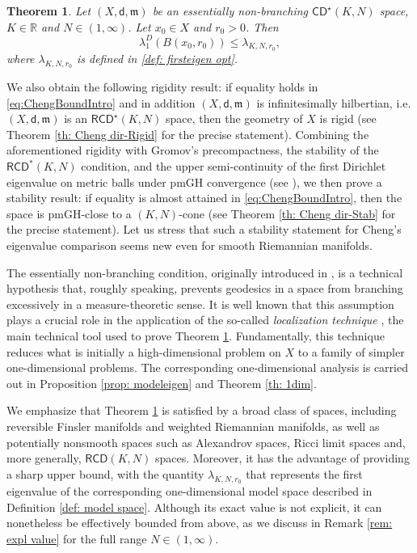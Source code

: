 \documentclass[12pt]{article}
\newcommand{\R}{\mathbb{R}}
\newcommand{\RCD}{\mathsf{RCD}}
\newcommand{\CD}{\mathsf{CD}}
\newcommand{\mm}{\mathfrak m}
\newcommand{\di}{\mathsf{d}}
\theoremstyle{plain}
\newtheorem{theorem}[lemma]{Theorem}
\theoremstyle{definition}
\begin{document}
\begin{theorem}\label{th: Cheng dir}
Let $(X,\di,\mm)$ be an essentially non-branching $\CD^{\star}(K,N)$ space, $K\in \R$ and $N\in (1,\infty)$. Let $x_0\in X$ and $r_0>0$. Then 
\begin{equation}\label{eq:ChengBoundIntro}
\lambda_1^D(B(x_0,r_0))\le \lambda_{K,N,r_0},
\end{equation}
where $\lambda_{K,N,r_0}$ is defined in \eqref{def: firsteigen opt}.
\end{theorem} 
We also obtain the following rigidity result: if equality holds in \eqref{eq:ChengBoundIntro} and in addition $(X,\di,\mm)$ is infinitesimally hilbertian, i.e.\;$(X,\di,\mm)$ is an $\RCD^{\star}(K,N)$ space, then the geometry of $X$ is rigid (see Theorem \ref{th: Cheng dir-Rigid} for the precise statement). Combining the aforementioned rigidity with Gromov's precompactness, the stability of the $\RCD^*(K,N)$ condition, and the upper semi-continuity of the first Dirichlet eigenvalue on metric balls under pmGH convergence (see \cite[Lemma 2.10]{AH18}), we then prove a stability result: if equality is almost attained in \eqref{eq:ChengBoundIntro}, then the space is pmGH-close to a $(K,N)$-cone (see Theorem \ref{th: Cheng dir-Stab} for the precise statement). Let us stress that such a stability statement for Cheng's eigenvalue comparison seems new even for smooth Riemannian manifolds.
\medskip

The essentially non-branching condition, originally introduced in \cite{rajala-sturm}, is a technical hypothesis that, roughly speaking, prevents geodesics in a space from branching excessively in a measure-theoretic sense. It is well known that this assumption plays a crucial role in the application of the so-called \emph{localization technique} \cite{cavalletti-mondino-inv}, the main technical tool used to prove Theorem \ref{th: Cheng dir}. Fundamentally, this technique reduces what is initially a high-dimensional problem on $X$ to a family of simpler one-dimensional problems. The corresponding one-dimensional analysis is carried out in Proposition \ref{prop: modeleigen} and Theorem \ref{th: 1dim}.

We emphasize that Theorem \ref{th: Cheng dir} is satisfied by a broad class of spaces, including reversible Finsler manifolds and weighted Riemannian manifolds, as well as potentially nonsmooth spaces such as Alexandrov spaces, Ricci limit spaces and, more generally, $\RCD(K,N)$ spaces. Moreover, it has the advantage of providing a sharp upper bound, with the quantity $\lambda_{K,N,r_0}$ that represents the first eigenvalue of the corresponding one-dimensional model space described in Definition \ref{def: model space}. Although its exact value is not explicit, it can nonetheless be effectively bounded from above, as we discuss in Remark \ref{rem: expl value} for the full range $N\in (1,\infty)$.
\end{document}
